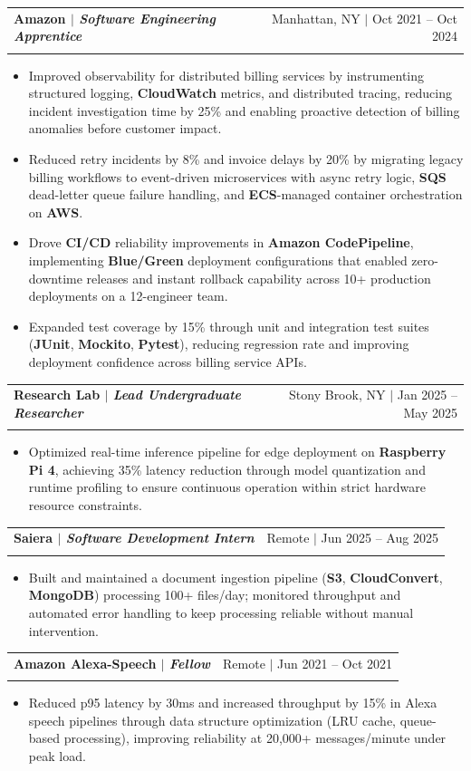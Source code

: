 \documentclass[letterpaper,11pt]{article}
\makeatletter
\newcommand{\resumeItem}[1]{\item\small{{#1 \vspace{-2pt}}}}
\newcommand{\resumeSubheading}[4]{
  \item
  \begin{tabular*}{0.97\textwidth}[t]{l@{\extracolsep{\fill}}r}
    \textbf{#1} & #2 \\
    \textit{\small#3} & \textit{\small #4} \\
  \end{tabular*}\vspace{-20pt}
}
\newcommand{\resumeItemListStart}{\begin{itemize}}
\newcommand{\resumeItemListEnd}{\end{itemize}\vspace{-5pt}}
\makeatother
\begin{document}
\resumeSubheading
  {{\textbf{Amazon}} $|$ {\normalfont\textit{Software Engineering Apprentice}}}
  {Manhattan, NY $|$ Oct 2021 -- Oct 2024}
  {}{}
\resumeItemListStart
  \resumeItem{Improved observability for distributed billing services by instrumenting structured logging, \textbf{CloudWatch} metrics, and distributed tracing, reducing incident investigation time by 25\% and enabling proactive detection of billing anomalies before customer impact.}
  \resumeItem{Reduced retry incidents by 8\% and invoice delays by 20\% by migrating legacy billing workflows to event-driven microservices with async retry logic, \textbf{SQS} dead-letter queue failure handling, and \textbf{ECS}-managed container orchestration on \textbf{AWS}.}
  \resumeItem{Drove \textbf{CI/CD} reliability improvements in \textbf{Amazon CodePipeline}, implementing \textbf{Blue/Green} deployment configurations that enabled zero-downtime releases and instant rollback capability across 10+ production deployments on a 12-engineer team.}
  \resumeItem{Expanded test coverage by 15\% through unit and integration test suites (\textbf{JUnit}, \textbf{Mockito}, \textbf{Pytest}), reducing regression rate and improving deployment confidence across billing service APIs.}
\resumeItemListEnd

\resumeSubheading
  {{\textbf{Research Lab}} $|$ {\normalfont\textit{Lead Undergraduate Researcher}}}
  {Stony Brook, NY $|$ Jan 2025 -- May 2025}
  {}{}
\resumeItemListStart
  \resumeItem{Optimized real-time inference pipeline for edge deployment on \textbf{Raspberry Pi 4}, achieving 35\% latency reduction through model quantization and runtime profiling to ensure continuous operation within strict hardware resource constraints.}
\resumeItemListEnd

\resumeSubheading
  {{\textbf{Saiera}} $|$ {\normalfont\textit{Software Development Intern}}}
  {Remote $|$ Jun 2025 -- Aug 2025}
  {}{}
\resumeItemListStart
  \resumeItem{Built and maintained a document ingestion pipeline (\textbf{S3}, \textbf{CloudConvert}, \textbf{MongoDB}) processing 100+ files/day; monitored throughput and automated error handling to keep processing reliable without manual intervention.}
\resumeItemListEnd

\resumeSubheading
  {{\textbf{Amazon Alexa-Speech}} $|$ {\normalfont\textit{Fellow}}}
  {Remote $|$ Jun 2021 -- Oct 2021}
  {}{}
\resumeItemListStart
  \resumeItem{Reduced p95 latency by 30ms and increased throughput by 15\% in Alexa speech pipelines through data structure optimization (LRU cache, queue-based processing), improving reliability at 20,000+ messages/minute under peak load.}
\resumeItemListEnd
\end{document}
